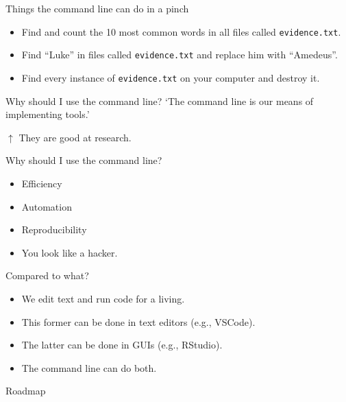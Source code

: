 \begin{frame}{Things the command line can do in a pinch}
    \stretchon
    \begin{itemize}
        \item Find and count the 10 most common words in all files
            called \texttt{evidence.txt}.
        \item Find ``Luke'' in files called \texttt{evidence.txt}
            and replace him with ``Amedeus''.
        \item Find every instance of \texttt{evidence.txt} on your computer and destroy it.
   \end{itemize}
\end{frame}

\begin{frame}{Why should I use the command line?}
`The command line is our means of implementing tools.'

\cite{gentzkowshapiromanual}

\vspace{1cm}

$\uparrow$ They are good at research.
\end{frame}

\begin{frame}{Why should I use the command line?}
\stretchon
\begin{itemize}
    \item Efficiency
    \item Automation
    \item Reproducibility
    \item You look like a hacker.
\end{itemize}
\end{frame}


\begingroup
\large
\begin{frame}{Compared to what?}
\stretchon
    \begin{itemize}
        \item[] We edit text and run code for a living.
        \item[] This former can be done in text editors (e.g., VSCode).
        \item[] The latter can be done in GUIs (e.g., RStudio).
        \item[] The command line can do both.
    \end{itemize}
\end{frame}
\endgroup

\begin{frame}{Roadmap}
\stretchon
    \tableofcontents
\end{frame}
